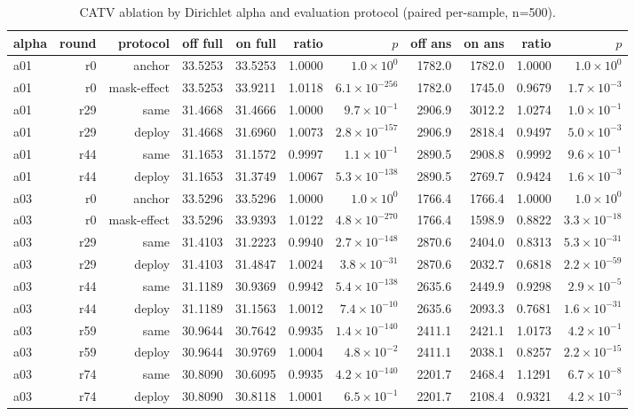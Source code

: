 \begin{table}[t]
\centering
\caption{CATV ablation by Dirichlet alpha and evaluation protocol (paired per-sample, n=500).}
\label{tab:opt-catv}
\begin{tabular}{lrrrrrrrrrr}
\toprule
alpha & round & protocol & off full & on full & ratio & $p$ & off ans & on ans & ratio & $p$ \\
\midrule
a01 & r0 & anchor & 33.5253 & 33.5253 & 1.0000 & $1.0\times 10^{0}$ & 1782.0 & 1782.0 & 1.0000 & $1.0\times 10^{0}$ \\
a01 & r0 & mask-effect & 33.5253 & 33.9211 & 1.0118 & $6.1\times 10^{-256}$ & 1782.0 & 1745.0 & 0.9679 & $1.7\times 10^{-3}$ \\
a01 & r29 & same & 31.4668 & 31.4666 & 1.0000 & $9.7\times 10^{-1}$ & 2906.9 & 3012.2 & 1.0274 & $1.0\times 10^{-1}$ \\
a01 & r29 & deploy & 31.4668 & 31.6960 & 1.0073 & $2.8\times 10^{-157}$ & 2906.9 & 2818.4 & 0.9497 & $5.0\times 10^{-3}$ \\
a01 & r44 & same & 31.1653 & 31.1572 & 0.9997 & $1.1\times 10^{-1}$ & 2890.5 & 2908.8 & 0.9992 & $9.6\times 10^{-1}$ \\
a01 & r44 & deploy & 31.1653 & 31.3749 & 1.0067 & $5.3\times 10^{-138}$ & 2890.5 & 2769.7 & 0.9424 & $1.6\times 10^{-3}$ \\
a03 & r0 & anchor & 33.5296 & 33.5296 & 1.0000 & $1.0\times 10^{0}$ & 1766.4 & 1766.4 & 1.0000 & $1.0\times 10^{0}$ \\
a03 & r0 & mask-effect & 33.5296 & 33.9393 & 1.0122 & $4.8\times 10^{-270}$ & 1766.4 & 1598.9 & 0.8822 & $3.3\times 10^{-18}$ \\
a03 & r29 & same & 31.4103 & 31.2223 & 0.9940 & $2.7\times 10^{-148}$ & 2870.6 & 2404.0 & 0.8313 & $5.3\times 10^{-31}$ \\
a03 & r29 & deploy & 31.4103 & 31.4847 & 1.0024 & $3.8\times 10^{-31}$ & 2870.6 & 2032.7 & 0.6818 & $2.2\times 10^{-59}$ \\
a03 & r44 & same & 31.1189 & 30.9369 & 0.9942 & $5.4\times 10^{-138}$ & 2635.6 & 2449.9 & 0.9298 & $2.9\times 10^{-5}$ \\
a03 & r44 & deploy & 31.1189 & 31.1563 & 1.0012 & $7.4\times 10^{-10}$ & 2635.6 & 2093.3 & 0.7681 & $1.6\times 10^{-31}$ \\
a03 & r59 & same & 30.9644 & 30.7642 & 0.9935 & $1.4\times 10^{-140}$ & 2411.1 & 2421.1 & 1.0173 & $4.2\times 10^{-1}$ \\
a03 & r59 & deploy & 30.9644 & 30.9769 & 1.0004 & $4.8\times 10^{-2}$ & 2411.1 & 2038.1 & 0.8257 & $2.2\times 10^{-15}$ \\
a03 & r74 & same & 30.8090 & 30.6095 & 0.9935 & $4.2\times 10^{-140}$ & 2201.7 & 2468.4 & 1.1291 & $6.7\times 10^{-8}$ \\
a03 & r74 & deploy & 30.8090 & 30.8118 & 1.0001 & $6.5\times 10^{-1}$ & 2201.7 & 2108.4 & 0.9321 & $4.2\times 10^{-3}$ \\
\bottomrule
\end{tabular}
\end{table}
